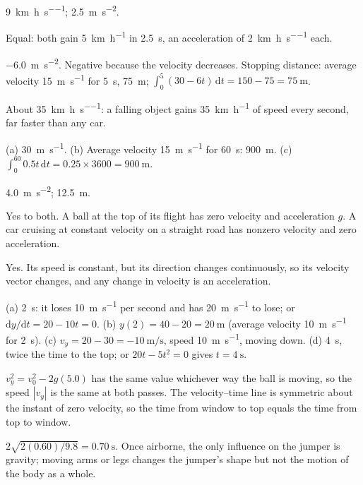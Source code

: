 \documentclass[11pt,twoside,openany]{book}
\newcommand{\dd}{\mathrm{d}}
\begin{document}
\begin{description}[leftmargin=2.6em,itemsep=3pt,style=sameline]
  \item[2.40] \SI{9}{\kilo\metre\per\hour\per\second}; \SI{2.5}{\metre\per\second\squared}.
  \item[2.41] Equal: both gain \SI{5}{\kilo\metre\per\hour} in \SI{2.5}{\second}, an acceleration of \SI{2}{\kilo\metre\per\hour\per\second} each.
  \item[2.42] \SI{-6.0}{\metre\per\second\squared}. Negative because the velocity decreases. Stopping distance: average velocity \SI{15}{\metre\per\second} for \SI{5}{\second}, \SI{75}{\metre}; $\int_0^5 (30 - 6t)\,\dd t = 150 - 75 = \SI{75}{\metre}$.
  \item[2.43] About \SI{35}{\kilo\metre\per\hour\per\second}: a falling object gains \SI{35}{\kilo\metre\per\hour} of speed every second, far faster than any car.
  \item[2.44] (a) \SI{30}{\metre\per\second}. (b) Average velocity \SI{15}{\metre\per\second} for \SI{60}{\second}: \SI{900}{\metre}. (c) $\int_0^{60} 0.5t\,\dd t = 0.25 \times 3600 = \SI{900}{\metre}$.
  \item[2.45] \SI{4.0}{\metre\per\second\squared}; \SI{12.5}{\metre}.
  \item[2.46] Yes to both. A ball at the top of its flight has zero velocity and acceleration $g$. A car cruising at constant velocity on a straight road has nonzero velocity and zero acceleration.
  \item[2.47] Yes. Its speed is constant, but its direction changes continuously, so its velocity vector changes, and any change in velocity is an acceleration.
  \item[2.48] (a) \SI{2}{\second}: it loses \SI{10}{\metre\per\second} per second and has \SI{20}{\metre\per\second} to lose; or $\dd y/\dd t = 20 - 10t = 0$. (b) $y(2) = 40 - 20 = \SI{20}{\metre}$ (average velocity \SI{10}{\metre\per\second} for \SI{2}{\second}). (c) $v_y = 20 - 30 = \SI{-10}{\metre\per\second}$, speed \SI{10}{\metre\per\second}, moving down. (d) \SI{4}{\second}, twice the time to the top; or $20t - 5t^2 = 0$ gives $t = \SI{4}{\second}$.
  \item[2.49] $v_y^2 = v_0^2 - 2g(5.0)$ has the same value whichever way the ball is moving, so the speed $|v_y|$ is the same at both passes. The velocity--time line is symmetric about the instant of zero velocity, so the time from window to top equals the time from top to window.
  \item[2.50] $2\sqrt{2(0.60)/9.8} = \SI{0.70}{\second}$. Once airborne, the only influence on the jumper is gravity; moving arms or legs changes the jumper's shape but not the motion of the body as a whole.

\end{description}
\end{document}
